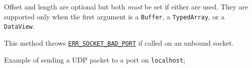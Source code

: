 Offset and length are optional but both \emph{must} be set if either are
used. They are supported only when the first argument is a
\texttt{Buffer}, a \texttt{TypedArray}, or a \texttt{DataView}.

This method throws
\href{errors.md\#err_socket_bad_port}{\texttt{ERR\_SOCKET\_BAD\_PORT}}
if called on an unbound socket.

Example of sending a UDP packet to a port on \texttt{localhost};

\begin{Shaded}
\begin{Highlighting}[]
 \OperatorTok{;}
\NormalTok{ \{ }\NormalTok{ \} } \OperatorTok{;}

\OperatorTok{=} \NormalTok{(}\NormalTok{)}\OperatorTok{;}
\OperatorTok{=}\NormalTok{(}\NormalTok{)}\OperatorTok{;}
\OperatorTok{,} \OperatorTok{,} \OperatorTok{,}\KeywordTok{=\textgreater{}}\NormalTok{ \{}
\NormalTok{()}\OperatorTok{;}
\NormalTok{\})}\OperatorTok{;}
\end{Highlighting}
\end{Shaded}

\begin{Shaded}
\begin{Highlighting}[]
\OperatorTok{=} \NormalTok{(}\NormalTok{)}\OperatorTok{;}
\NormalTok{ \{ }\NormalTok{ \} }\OperatorTok{=} \NormalTok{(}\NormalTok{)}\OperatorTok{;}

\OperatorTok{=} \NormalTok{(}\NormalTok{)}\OperatorTok{;}
\OperatorTok{=}\NormalTok{(}\NormalTok{)}\OperatorTok{;}
\OperatorTok{,} \OperatorTok{,} \OperatorTok{,}\KeywordTok{=\textgreater{}}\NormalTok{ \{}
\NormalTok{()}\OperatorTok{;}
\NormalTok{\})}\OperatorTok{;}
\end{Highlighting}
\end{Shaded}

